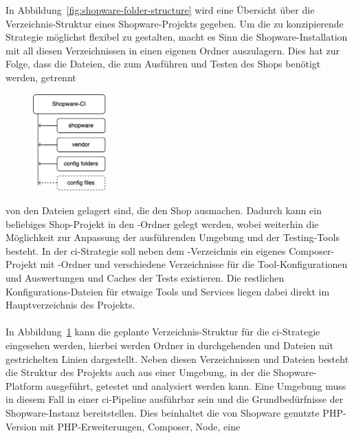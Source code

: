 In Abbildung\ \ref{fig:shopware-folder-structure} wird eine Übersicht über die Verzeichnis-Struktur eines
Shopware-Projekts gegeben.
Um die zu konzipierende Strategie möglichst flexibel zu gestalten, macht es Sinn die Shopware-Installation mit all
diesen Verzeichnissen in einen eigenen Ordner auszulagern.
Dies hat zur Folge, dass die Dateien, die zum Ausführen und Testen des Shops benötigt werden, getrennt
\begin{figure}
    \centering
    \includegraphics[width=0.25\textwidth]{images/content/shopware-ci-folder-structure}
    \label{fig:shopware-ci-folder-structure}
\end{figure}
von den Dateien gelagert sind, die den Shop ausmachen.
Dadurch kann ein beliebiges Shop-Projekt in den -Ordner gelegt werden, wobei weiterhin die
Möglichkeit zur Anpassung der ausführenden Umgebung und der Testing-Tools besteht.
In der \acrshort{ci}-Strategie soll neben dem -Verzeichnis ein eigenes Composer-Projekt mit
-Ordner und verschiedene Verzeichnisse für die Tool-Konfigurationen und Auswertungen und Caches
der Tests existieren.
Die restlichen Konfigurations-Dateien für etwaige Tools und Services liegen dabei direkt im Hauptverzeichnis des
\mbox{Projekts}.
\\\\
In Abbildung\ \ref{fig:shopware-ci-folder-structure} kann die geplante Verzeichnis-Struktur für die
\acrshort{ci}-Strategie eingesehen werden, hierbei werden Ordner in durchgehenden und Dateien mit gestrichelten Linien
dargestellt.
Neben diesen Verzeichnissen und Dateien besteht die Struktur des Projekts auch aus einer Umgebung, in der die
Shopware-Platform ausgeführt, getestet und analysiert werden kann.
Eine Umgebung muss in diesem Fall in einer \acrshort{ci}-Pipeline ausführbar sein und die Grundbedürfnisse der
Shopware-Instanz bereitstellen.
Dies beinhaltet die von Shopware genutzte PHP-Version mit PHP-Erweiterungen, Composer, Node, eine
